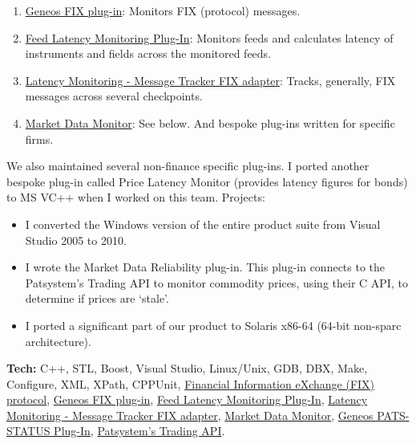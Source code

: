 \documentclass[
  a4paper,
  8pt,
]{article}
\providecommand{\tightlist}{%
  \setlength{\itemsep}{0pt}\setlength{\parskip}{0pt}}
\begin{document}
\begin{multicols}{2}
\begin{enumerate}
\def\labelenumi{\arabic{enumi}.}
\tightlist
\item
  \href{https://docs.itrsgroup.com/docs/geneos/5.1.0/Netprobe/trading_fix/fix.html}{Geneos
  FIX plug-in}: Monitors FIX (protocol) messages.
\item
  \href{https://docs.itrsgroup.com/docs/geneos/5.2.0/Netprobe/market_data_monitoring/feedadapter_ug.html}{Feed
  Latency Monitoring Plug-In}: Monitors feeds and calculates latency of
  instruments and fields across the monitored feeds.
\item
  \href{https://docs.itrsgroup.com/docs/geneos/5.2.0/Netprobe/latency_monitoring/message_tracker/fix_adapter.html}{Latency
  Monitoring - Message Tracker FIX adapter}: Tracks, generally, FIX
  messages across several checkpoints.
\item
  \href{https://docs.itrsgroup.com/docs/geneos/5.2.0/Netprobe/market_data_monitoring/mdm_ug.html}{Market
  Data Monitor}: See below. And bespoke plug-ins written for specific
  firms.
\end{enumerate}

We also maintained several non-finance specific plug-ins. I ported
another bespoke plug-in called Price Latency Monitor (provides latency
figures for bonds) to MS VC++ when I worked on this team. Projects:

\begin{itemize}
\tightlist
\item
  I converted the Windows version of the entire product suite from
  Visual Studio 2005 to 2010.
\item
  I wrote the Market Data Reliability plug-in. This plug-in connects to
  the Patsystem's Trading API to monitor commodity prices, using their C
  API, to determine if prices are `stale'.
\item
  I ported a significant part of our product to Solaris x86-64 (64-bit
  non-sparc architecture).
\end{itemize}

\textbf{Tech:} C++, STL, Boost, Visual Studio, Linux/Unix, GDB, DBX,
Make, Configure, XML, XPath, CPPUnit,
\href{https://en.wikipedia.org/wiki/Financial_Information_eXchange}{Financial
Information eXchange (FIX) protocol},
\href{https://docs.itrsgroup.com/docs/geneos/5.1.0/Netprobe/trading_fix/fix.html}{Geneos
FIX plug-in},
\href{https://docs.itrsgroup.com/docs/geneos/5.2.0/Netprobe/market_data_monitoring/feedadapter_ug.html}{Feed
Latency Monitoring Plug-In},
\href{https://docs.itrsgroup.com/docs/geneos/5.2.0/Netprobe/latency_monitoring/message_tracker/fix_adapter.html}{Latency
Monitoring - Message Tracker FIX adapter},
\href{https://docs.itrsgroup.com/docs/geneos/5.2.0/Netprobe/market_data_monitoring/mdm_ug.html}{Market
Data Monitor},
\href{https://docs.itrsgroup.com/docs/geneos/5.1.0/Netprobe/trading_pats/pats-status.html}{Geneos
PATS-STATUS Plug-In}, \href{www.patsystems.com}{Patsystem's Trading
API}.


\end{multicols}
\end{document}
